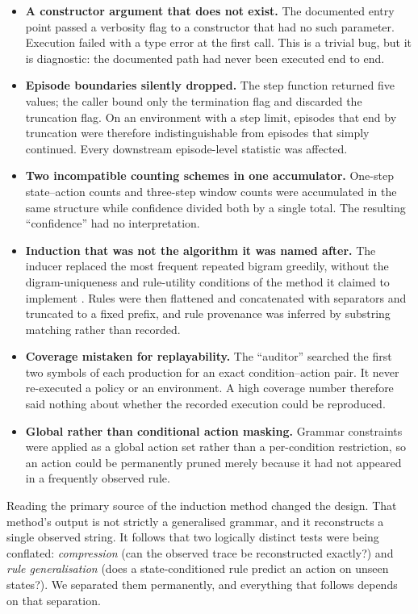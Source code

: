 \documentclass[11pt,a4paper]{article}
\begin{document}
\begin{itemize}
  \item \textbf{A constructor argument that does not exist.} The documented entry point passed a verbosity flag to a constructor that had no such parameter. Execution failed with a type error at the first call. This is a trivial bug, but it is diagnostic: the documented path had never been executed end to end.
  \item \textbf{Episode boundaries silently dropped.} The step function returned five values; the caller bound only the termination flag and discarded the truncation flag. On an environment with a step limit, episodes that end by truncation were therefore indistinguishable from episodes that simply continued. Every downstream episode-level statistic was affected.
  \item \textbf{Two incompatible counting schemes in one accumulator.} One-step state--action counts and three-step window counts were accumulated in the same structure while confidence divided both by a single total. The resulting ``confidence'' had no interpretation.
  \item \textbf{Induction that was not the algorithm it was named after.} The inducer replaced the most frequent repeated bigram greedily, without the digram-uniqueness and rule-utility conditions of the method it claimed to implement \citep{nevillmanning1997}. Rules were then flattened and concatenated with separators and truncated to a fixed prefix, and rule provenance was inferred by substring matching rather than recorded.
  \item \textbf{Coverage mistaken for replayability.} The ``auditor'' searched the first two symbols of each production for an exact condition--action pair. It never re-executed a policy or an environment. A high coverage number therefore said nothing about whether the recorded execution could be reproduced.
  \item \textbf{Global rather than conditional action masking.} Grammar constraints were applied as a global action set rather than a per-condition restriction, so an action could be permanently pruned merely because it had not appeared in a frequently observed rule.
\end{itemize}

Reading the primary source of the induction method changed the design. That method's output is not strictly a generalised grammar, and it reconstructs a single observed string. It follows that two logically distinct tests were being conflated: \emph{compression} (can the observed trace be reconstructed exactly?) and \emph{rule generalisation} (does a state-conditioned rule predict an action on unseen states?). We separated them permanently, and everything that follows depends on that separation.
\end{document}

